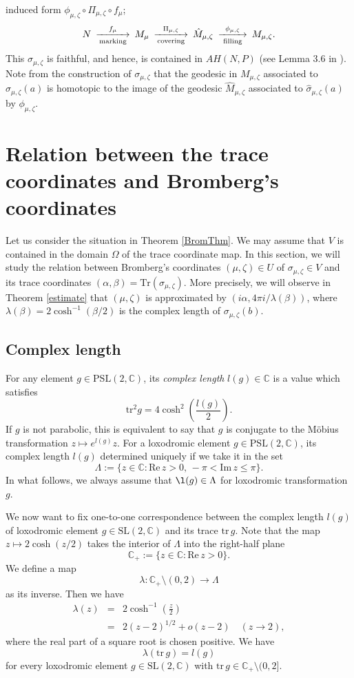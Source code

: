 \documentclass[12pt]{article}
\theoremstyle{plain}
\theoremstyle{definition}
\theoremstyle{remark}
\newcommand{\C}{\mathbb C}
\newcommand{\lam}{\lambda}
\newcommand{\alp}{\alpha}
\newcommand{\Lam}{\Lambda}
\newcommand{\sm}{\setminus}
\newcommand{\ze}{\zeta}
\newcommand{\tr}{{\mathrm{tr}}}
\newcommand{\Tr}{{\mathrm{Tr}}}
\newcommand{\im}{\mathrm{Im}}
\newcommand{\re}{\mathrm{Re}}
\newcommand{\psl}{{\mathrm{PSL}}(2,\mathbb C)}
\newcommand{\ssl}{{\mathrm{SL}}(2,\mathbb C)}
\begin{document}
induced form $\phi_{\mu,\ze} \circ \Pi_{\mu,\ze} \circ f_\mu$; 
\begin{eqnarray*}
\begin{CD}
N@>{f_\mu}>{\text{marking}}> M_\mu @>{\Pi_{\mu,\ze}}>{\text{covering}}>
 \hat M_{\mu,\ze} @>{\phi_{\mu,\ze}}>{\text{filling}}> M_{\mu,\ze}. 
\end{CD}
\end{eqnarray*}
This $\sigma_{\mu,\ze}$ is faithful, and hence, is contained in $AH(N,P)$ (see Lemma 3.6 in \cite{Br}).  
Note from the construction of $\sigma_{\mu,\ze}$ that the geodesic in $M_{\mu,\ze}$ 
associated to $\sigma_{\mu,\ze}(a)$ is homotopic to 
the image of the geodesic $\hat M_{\mu,\ze}$ associated to 
$\hat\sigma_{\mu,\ze}(a)$ by $\phi_{\mu,\ze}$. 


\section{Relation between the trace coordinates and Bromberg's coordinates}

Let us consider the situation in Theorem \ref{BromThm}.  
We may assume that $V$ is contained in the domain $\Omega$ of the trace coordinate map.  
In this section, we will study the relation between 
Bromberg's coordinates $(\mu,\ze) \in U$ of $\sigma_{\mu,\ze} \in V$ 
and its trace coordinates $(\alp,\beta)=\Tr(\sigma_{\mu,\ze})$. 
More precisely, we will observe in Theorem \ref{estimate} that  
$(\mu, \ze)$ is approximated by $(i\alp, 4\pi i/\lam(\beta))$, 
where $\lam(\beta)=2 \cosh^{-1}(\beta/2)$ 
is the complex length of $\sigma_{\mu,\ze}(b)$. 


\subsection{Complex length}

For any  element $g \in \psl$, its {\it complex length} $l(g) \in \C$  is a value which satisfies 
$$
{\tr^2 g}= 4\cosh^2
\left(\frac{l(g)}{2}\right).  
$$
If $g$ is not parabolic, this is equivalent to say that $g$ is conjugate to the M\"{o}bius transformation 
$z \mapsto e^{l(g)}z$. 
For a loxodromic element $g \in \psl$, 
its complex length $l(g)$ determined uniquely 
 if we take it in the set 
$$
\Lam:=\{z \in \C : \re \,z > 0, \, -\pi< \im \,z \le \pi\}. 
$$
In what follows, we always assume that $\l(g) \in \Lam$ for loxodromic transformation $g$.  

We now want to fix one-to-one correspondence  between 
the complex length $l(g)$ of loxodromic element $g \in \ssl$ and its trace $\tr\,g$. 
Note that the map $z \mapsto 2 \cosh(z/2)$ takes the interior of $\Lambda$ 
into the right-half plane  
$$\C_+:=\{z \in \C : \re\,z>0\}.$$
We define a map 
$$
\lam:\C_+ \sm (0,2) \to \Lambda
$$
as its inverse. 
Then we have 
\begin{eqnarray*}
\lam(z) &=&2\cosh^{-1}\left(\frac{z}{2}\right) \\
&=& 2 (z-2)^{1/2}+o(z-2) \quad (z \to 2), 
\end{eqnarray*}
where the real part of a square root is chosen positive. 
We have 
$$\lam(\tr\, g)=l(g)$$ 
for every loxodromic element $g \in \ssl$ with $\tr \,g \in \C_+ \sm (0,2]$. 
\end{document}
